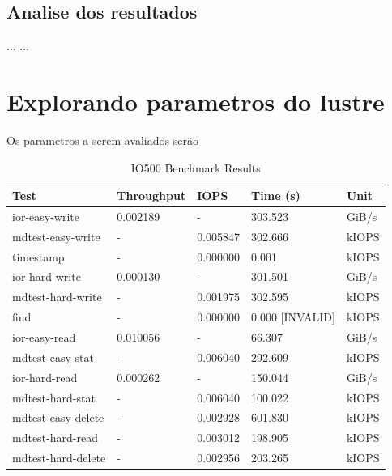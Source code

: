 \documentclass[article,a4paper,12pt,brazil,sumario=tradicional]{abntex2}
\begin{document}
\subsection{Analise dos resultados}
...
...
\section{Explorando parametros do lustre}
Os parametros a serem avaliados serão 
\begin{table}[htb]
	\centering
	\begin{tabular}{|l|l|l|l|l|}
		\hline
		\rowcolor[HTML]{EFEFEF}
		\textbf{Test}          & \textbf{Throughput}        & \textbf{IOPS}         & \textbf{Time (s)} & \textbf{Unit} \\ \hline
		ior-easy-write         & 0.002189                    & -                    & 303.523           & GiB/s         \\ \hline
		mdtest-easy-write      & -                          & 0.005847             & 302.666           & kIOPS         \\ \hline
		timestamp              & -                          & 0.000000             & 0.001             & kIOPS         \\ \hline
		ior-hard-write         & 0.000130                    & -                    & 301.501           & GiB/s         \\ \hline
		mdtest-hard-write      & -                          & 0.001975             & 302.595           & kIOPS         \\ \hline
		find                   & -                          & 0.000000             & 0.000 [INVALID]   & kIOPS         \\ \hline
		ior-easy-read          & 0.010056                    & -                    & 66.307            & GiB/s         \\ \hline
		mdtest-easy-stat       & -                          & 0.006040             & 292.609           & kIOPS         \\ \hline
		ior-hard-read          & 0.000262                    & -                    & 150.044           & GiB/s         \\ \hline
		mdtest-hard-stat       & -                          & 0.006040             & 100.022           & kIOPS         \\ \hline
		mdtest-easy-delete     & -                          & 0.002928             & 601.830           & kIOPS         \\ \hline
		mdtest-hard-read       & -                          & 0.003012             & 198.905           & kIOPS         \\ \hline
		mdtest-hard-delete     & -                          & 0.002956             & 203.265           & kIOPS         \\ \hline
	\end{tabular}
	\caption{IO500 Benchmark Results}
	\label{tab:io500-results}
\end{table}
\end{document}
